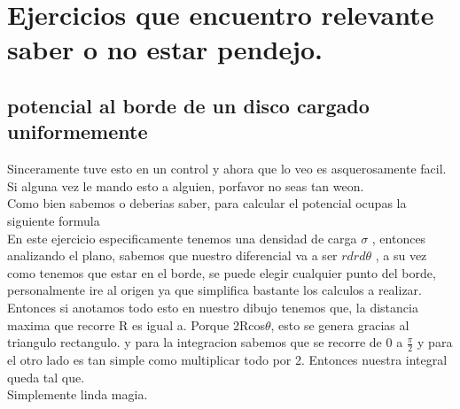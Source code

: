 \newpage
\section{Ejercicios que encuentro relevante saber o no estar pendejo.}
\subsection{potencial al borde de un disco cargado uniformemente}
Sinceramente tuve esto en un control y ahora que lo veo es asquerosamente facil. Si alguna vez le mando esto a alguien, porfavor no seas tan weon.\\
Como bien sabemos o deberias saber, para calcular el potencial ocupas la siguiente formula
\\
En este ejercicio especificamente tenemos una densidad de carga $\sigma$ , entonces analizando el plano, sabemos que nuestro diferencial va a ser $rdrd\theta$ , a su vez como tenemos que estar en el borde, se puede elegir cualquier punto del borde, personalmente ire al origen ya que simplifica bastante los calculos a realizar.\\
Entonces si anotamos todo esto en nuestro dibujo tenemos que, la distancia maxima que recorre R es igual a.
Porque 2Rcos$\theta$, esto se genera gracias al triangulo rectangulo. y para la integracion sabemos que se recorre de 0 a $\frac{\pi}{2}$ y para el otro lado es tan simple como multiplicar todo por 2. Entonces nuestra integral queda tal que.
\\
Simplemente linda magia.
